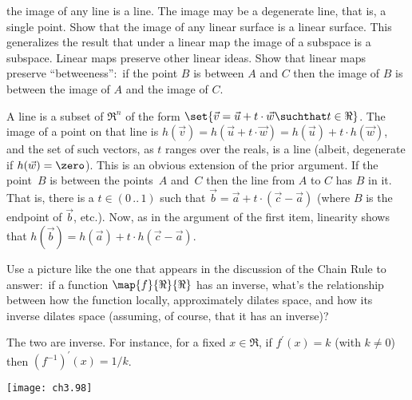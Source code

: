 \begin{exercises}
\begin{exparts}
         the image of any line is a line.
         The image may be a degenerate line, that is, a single point.
      \partsitem Show that the image of any linear surface is a linear surface.
         This generalizes the result that under a linear map the image of
         a subspace is a subspace.
      \partsitem Linear maps preserve other linear ideas.
         Show that linear maps preserve ``betweeness'':~if the point
         $B$ is between $A$ and $C$ then the image of $B$ is between the
         image of $A$ and the image of $C$.
    \end{exparts}
    \begin{answer}
      \begin{exparts}
        \partsitem A line is a subset of $\Re^n$ of the form
          $\set{\vec{v}=\vec{u}+t\cdot\vec{w}\suchthat t\in\Re}$.
          The image of a point on that line is 
          $h(\vec{v})=h(\vec{u}+t\cdot\vec{w})=h(\vec{u})+t\cdot h(\vec{w})$,
          and the set of such vectors, as $t$ ranges over the reals, is
          a line (albeit, degenerate if $h(\vec{w})=\zero$).
        \partsitem This is an obvious extension of the prior argument.
        \partsitem If the point~$B$ is between the points~$A$ and~$C$ then the
          line from $A$ to $C$ has $B$ in it.
          That is, there is a $t\in (0\,..\,1)$ such that
          $\vec{b}=\vec{a}+t\cdot (\vec{c}-\vec{a})$ (where $B$ is the
          endpoint of $\vec{b}$, etc.).
          Now, as in the argument of the first item, linearity shows that
          $h(\vec{b})=h(\vec{a})+t\cdot h(\vec{c}-\vec{a})$.  
      \end{exparts}
    \end{answer}
  \item 
    Use a picture like the one 
    that appears in the discussion of the Chain Rule
    to answer:~if a function $\map{f}{\Re}{\Re}$ has an inverse,
    what's the relationship between how the function \Dash locally, 
    approximately \Dash  dilates space, and
    how its inverse dilates space (assuming, of course, that it has an 
    inverse)?
    \begin{answer}
      The two are inverse.
      For instance, for a fixed $x\in\Re$,
      if $f^\prime (x)=k$ (with $k\neq 0$) then 
      $(f^{-1})^\prime (x)=1/k$.
      \begin{center}
        \texttt{[image: ch3.98]}
     \end{center}
    \end{answer}
\end{exercises}
\endinput



